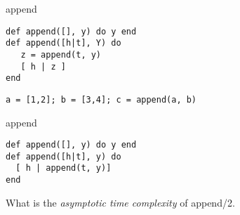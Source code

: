 \begin{frame}[fragile]{append}

\begin{verbatim}
def append([], y) do y end
def append([h|t], Y) do
   z = append(t, y)
   [ h | z ]
end
\end{verbatim}

\pause
\begin{verbatim}
a = [1,2]; b = [3,4]; c = append(a, b)
\end{verbatim}

\pause


\end{frame}



\begin{frame}[fragile]{append}

\begin{verbatim}
def append([], y) do y end
def append([h|t], y) do 
  [ h | append(t, y)] 
end
\end{verbatim}

\pause\vspace{20pt} What is the {\em asymptotic time complexity} of append/2.
\end{frame}


